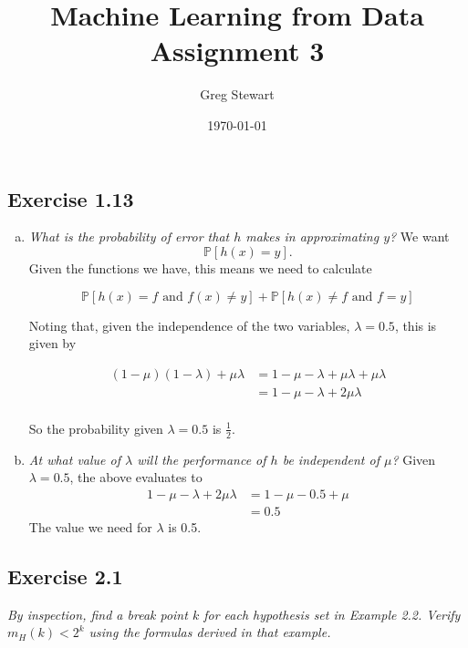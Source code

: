\documentclass{article}
\title{Machine Learning from Data Assignment 3}
\author{Greg Stewart}
\date{\today}
\begin{document}
\maketitle

\subsection*{Exercise 1.13}

\begin{enumerate}[(a)]
  \item \textit{What is the probability of error that $h$ makes in approximating $y$?}
    We want $$\mathbb{P}[h(x) = y].$$ Given the functions we have, this means we need to
    calculate 
      
    $$\mathbb{P}[h(x) = f \text{ and } f(x) \neq y] + \mathbb{P}[h(x) \neq f \text{ and } f = y]$$

    Noting that, given the independence of the two variables, $\lambda = 0.5$, this is given by
    
    \begin{align*}
      (1-\mu)(1-\lambda) + \mu\lambda &= 1 - \mu - \lambda + \mu\lambda + \mu\lambda \\
      &= 1 - \mu - \lambda + 2\mu\lambda \\
    \end{align*}

    So the probability given $\lambda =0.5$ is $\frac{1}{2}$.

  \item \textit{At what value of $\lambda$ will the performance of $h$ be independent of $\mu$?}
    Given $\lambda = 0.5$, the above evaluates to 
    \begin{align*}
      1 - \mu - \lambda + 2\mu\lambda &= 1 - \mu - 0.5 + \mu \\
      &= 0.5
    \end{align*}
    The value we need for $\lambda$ is 0.5.

\end{enumerate}


\subsection*{Exercise 2.1}

\textit{By inspection, find a break point $k$ for each hypothesis set in Example 2.2. Verify $m_H(k) < 2^k$ using the formulas derived in that example.}
\end{document}
